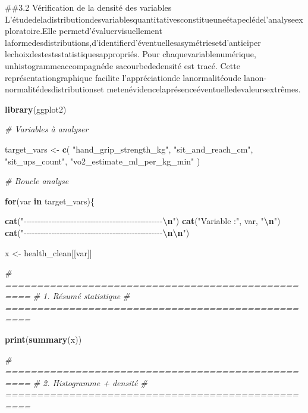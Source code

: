 \documentclass[
]{article}
\newenvironment{Shaded}{\begin{snugshade}}{\end{snugshade}}
\newcommand{\CommentTok}[1]{\textcolor[rgb]{0.56,0.35,0.01}{\textit{#1}}}
\newcommand{\ControlFlowTok}[1]{\textcolor[rgb]{0.13,0.29,0.53}{\textbf{#1}}}
\newcommand{\FunctionTok}[1]{\textcolor[rgb]{0.13,0.29,0.53}{\textbf{#1}}}
\newcommand{\NormalTok}[1]{#1}
\newcommand{\OtherTok}[1]{\textcolor[rgb]{0.56,0.35,0.01}{#1}}
\newcommand{\SpecialCharTok}[1]{\textcolor[rgb]{0.81,0.36,0.00}{\textbf{#1}}}
\newcommand{\StringTok}[1]{\textcolor[rgb]{0.31,0.60,0.02}{#1}}
\begin{document}
\#\#3.2 Vérification de la densité des variables
L'étudedeladistributiondesvariablesquantitativesconstitueuneétapeclédel'analyseexploratoire.Elle
permetd'évaluervisuellement
laformedesdistributions,d'identifierd'éventuellesasymétriesetd'anticiper
lechoixdestestsstatistiquesappropriés. Pour chaquevariablenumérique,
unhistogrammeaccompagnéde sacourbededensité est tracé. Cette
représentationgraphique facilite l'appréciationde lanormalitéoude
lanon-normalitédesdistributionset
metenévidencelaprésenceéventuelledevaleursextrêmes.

\begin{Shaded}
\begin{Highlighting}[]
\FunctionTok{library}\NormalTok{(ggplot2)}

\CommentTok{\# Variables à analyser}

\NormalTok{target\_vars }\OtherTok{\textless{}{-}} \FunctionTok{c}\NormalTok{(}
\StringTok{"hand\_grip\_strength\_kg"}\NormalTok{,}
\StringTok{"sit\_and\_reach\_cm"}\NormalTok{,}
\StringTok{"sit\_ups\_count"}\NormalTok{,}
\StringTok{"vo2\_estimate\_ml\_per\_kg\_min"}
\NormalTok{)}

\CommentTok{\# Boucle analyse}

\ControlFlowTok{for}\NormalTok{(var }\ControlFlowTok{in}\NormalTok{ target\_vars)\{}

\FunctionTok{cat}\NormalTok{(}\StringTok{"{-}{-}{-}{-}{-}{-}{-}{-}{-}{-}{-}{-}{-}{-}{-}{-}{-}{-}{-}{-}{-}{-}{-}{-}{-}{-}{-}{-}{-}{-}{-}{-}{-}{-}{-}{-}{-}{-}{-}{-}{-}{-}{-}{-}{-}{-}{-}{-}{-}{-}}\SpecialCharTok{\textbackslash{}n}\StringTok{"}\NormalTok{)}
\FunctionTok{cat}\NormalTok{(}\StringTok{"Variable :"}\NormalTok{, var, }\StringTok{"}\SpecialCharTok{\textbackslash{}n}\StringTok{"}\NormalTok{)}
\FunctionTok{cat}\NormalTok{(}\StringTok{"{-}{-}{-}{-}{-}{-}{-}{-}{-}{-}{-}{-}{-}{-}{-}{-}{-}{-}{-}{-}{-}{-}{-}{-}{-}{-}{-}{-}{-}{-}{-}{-}{-}{-}{-}{-}{-}{-}{-}{-}{-}{-}{-}{-}{-}{-}{-}{-}{-}{-}}\SpecialCharTok{\textbackslash{}n\textbackslash{}n}\StringTok{"}\NormalTok{)}

\NormalTok{x }\OtherTok{\textless{}{-}}\NormalTok{ health\_clean[[var]]}

\CommentTok{\# ==================================================}
\CommentTok{\# 1. Résumé statistique}
\CommentTok{\# ==================================================}

\FunctionTok{print}\NormalTok{(}\FunctionTok{summary}\NormalTok{(x))}

\CommentTok{\# ==================================================}
\CommentTok{\# 2. Histogramme + densité}
\CommentTok{\# ==================================================}


\end{Highlighting}
\end{Shaded}
\end{document}

